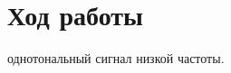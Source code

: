 \documentclass[a4paper,12pt]{article}
\begin{document}
\section{Ход работы}
\begin{enumerate}
{ однотональный сигнал низкой частоты.
\\}


\end{enumerate}
\end{document}
